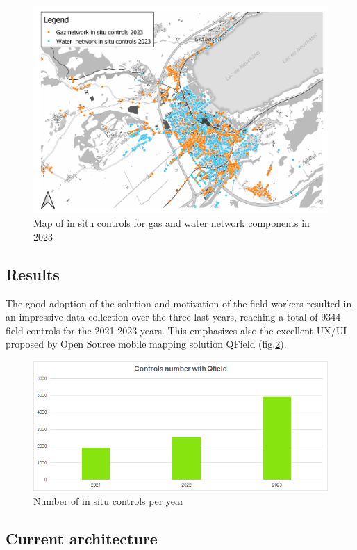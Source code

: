 \documentclass[runningheads]{llncs}
\begin{document}
\begin{figure}
	\includegraphics[width=\textwidth]{water_gas_2023.png}
	\caption{Map of in situ controls for gas and water network components in 2023} \label{fig1}
\end{figure}


\subsection{Results}

The good adoption of the solution and motivation of the field workers resulted in an impressive data collection over the three last years, reaching a total of 9344 field controls for the 2021-2023 years. This emphasizes also the excellent UX/UI proposed by Open Source mobile mapping solution QField (fig.\ref{fig2}).

\begin{figure}
	\includegraphics[width=\textwidth]{stats.png}
	\caption{Number of in situ controls per year} \label{fig2}
\end{figure}


\subsection{Current architecture}
\end{document}
